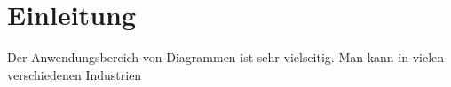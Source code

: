 \chapter{Einleitung}
Der Anwendungsbereich von Diagrammen ist sehr vielseitig. Man kann in vielen verschiedenen Industrien 